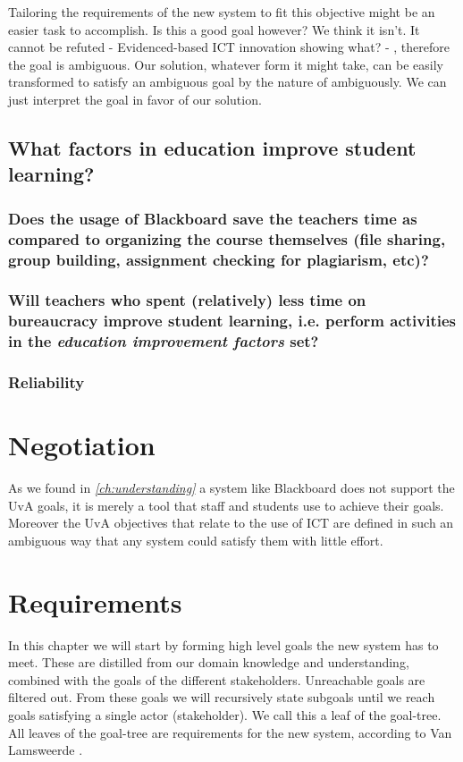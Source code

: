 Tailoring the requirements of the new system to fit this objective might be an easier task to accomplish. Is this a good goal however? We think it isn't. It cannot be refuted - Evidenced-based ICT innovation showing what? - , therefore the goal is ambiguous. Our solution, whatever form it might take, can be easily transformed to satisfy an ambiguous goal by the nature of ambiguously. We can just interpret the goal in favor of our solution. 

\todo{}

\section{What factors in education improve student learning?}

\subsection{Does the usage of Blackboard save the teachers time as compared to organizing the course themselves (file sharing, group building, assignment checking for plagiarism, etc)?}

\subsection{Will teachers who spent (relatively) less time on bureaucracy improve student learning, i.e. perform activities in the \textit{education improvement factors} set?}

\subsection{Reliability}


\chapter{Negotiation}
As we found in \emph{\ref{ch:understanding} } a system like Blackboard does not support the UvA goals, it is merely a tool that staff and students use to achieve their goals. Moreover the UvA objectives that relate to the use of ICT are defined in such an ambiguous way that any system could satisfy them with little effort.


\chapter{Requirements}
In this chapter we will start by forming high level goals the new system has to meet. These are distilled from our domain knowledge and understanding, combined with the goals of the different stakeholders. Unreachable goals are filtered out. From these goals we will recursively state subgoals until we reach goals satisfying a single actor (stakeholder). We call this a leaf of the goal-tree. All leaves of the goal-tree are requirements for the new system, according to Van Lamsweerde \cite{RE_book}.


